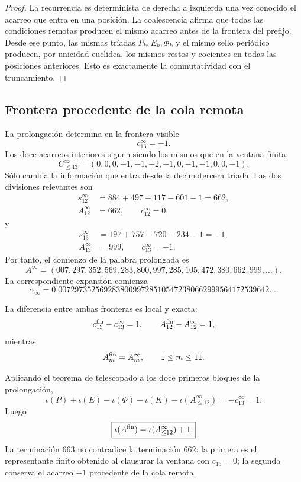 \begin{proof}
La recurrencia es determinista de derecha a izquierda una vez conocido el
acarreo que entra en una posición. La coalescencia afirma que todas las
condiciones remotas producen el mismo acarreo antes de la frontera del
prefijo. Desde ese punto, las mismas tríadas \(P_k,E_k,\Phi_k\) y el mismo
sello periódico producen, por unicidad euclídea, los mismos restos y
cocientes en todas las posiciones anteriores. Esto es exactamente la
conmutatividad con el truncamiento.
\end{proof}

\subsection{Frontera procedente de la cola remota}

La prolongación determina en la frontera visible
\[
 c_{13}^{\infty}=-1.
\]
Los doce acarreos interiores siguen siendo los mismos que en la ventana
finita:
\[
 \boxed{
 C_{\leq13}^{\infty}
 =(0,0,0,-1,-1,-2,-1,0,-1,-1,0,0,-1).}
\]
Sólo cambia la información que entra desde la decimotercera tríada. Las
dos divisiones relevantes son
\[
\begin{aligned}
 s_{12}^{\infty}
 &=884+497-117-601-1=662,\\
 A_{12}^{\infty}&=662,
 \qquad c_{12}^{\infty}=0,
\end{aligned}
\]
y
\[
\begin{aligned}
 s_{13}^{\infty}
 &=197+757-720-234-1=-1,\\
 A_{13}^{\infty}&=999,
 \qquad c_{13}^{\infty}=-1.
\end{aligned}
\]
Por tanto, el comienzo de la palabra prolongada es
\[
 \boxed{
 A^{\infty}
 =(007,297,352,569,283,800,997,285,105,472,380,662,999,\ldots).}
\]
La correspondiente expansión comienza
\begin{equation}
 \boxed{
 \alpha_{\infty}
 =0.007297352569283800997285105472380662999564172539642\ldots.}
 \label{p12-83-c10-s2:eq:alpha-infinita-autonoma}
\end{equation}

La diferencia entre ambas fronteras es local y exacta:
\[
 c_{13}^{\rm fin}-c_{13}^{\infty}=1,
 \qquad
 A_{12}^{\rm fin}-A_{12}^{\infty}=1,
\]
mientras
\[
 A_m^{\rm fin}=A_m^\infty,
 \qquad 1\leq m\leq11.
\]

Aplicando el teorema de telescopado a los doce primeros bloques de la
prolongación,
\[
 \iota(P)+\iota(E)-\iota(\Phi)-\iota(K)
 -\iota(A^\infty_{\leq12})
 =-c_{13}^{\infty}=1.
\]
Luego
\begin{equation}
 \boxed{
 \iota(A^{\rm fin})
 =\iota(A^\infty_{\leq12})+1.}
 \label{p12-83-c10-s2:eq:relacion-unidad-fronteras-alpha}
\end{equation}
La terminación \(663\) no contradice la terminación \(662\): la primera
es el representante finito obtenido al clausurar la ventana con
\(c_{13}=0\); la segunda conserva el acarreo \(-1\) procedente de la cola
remota.

